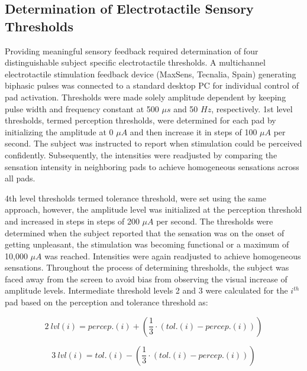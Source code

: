 
\subsection{Determination of Electrotactile Sensory Thresholds}


Providing meaningful sensory feedback required determination of four distinguishable subject specific electrotactile thresholds. A multichannel electrotactile stimulation feedback device (MaxSens, Tecnalia, Spain) generating biphasic pulses was connected to a standard desktop PC for individual control of pad activation. Thresholds were made solely amplitude dependent by keeping pulse width and frequency constant at 500 $\mu s$ and 50 $Hz$, respectively.  1st level thresholds, termed perception thresholds, were determined for each pad by initializing the amplitude at 0 $\mu A$ and then increase it in steps of 100 $\mu A$ per second. The subject was instructed to report when stimulation could be perceived confidently. Subsequently, the intensities were readjusted by comparing the sensation intensity in neighboring pads to achieve homogeneous sensations across all pads. 

4th level thresholds termed tolerance threshold, were set using the same approach, however, the amplitude level was initialized at the perception threshold and increased in steps in steps of 200 $\mu A$ per second. The thresholds were determined when the subject reported that the sensation was on the onset of getting unpleasant, the stimulation was becoming functional or a maximum of 10,000 $\mu A$ was reached. Intensities were again readjusted to achieve homogeneous sensations. Throughout the process of determining thresholds, the subject was faced away from the screen to avoid bias from observing the visual increase of amplitude levels. Intermediate threshold levels 2 and 3 were calculated for the $i^{th}$ pad based on the perception and tolerance threshold as: 

	\begin{equation}
	2~lvl(i) = percep.(i) + (\frac{1}{3} \cdot (tol.(i) - percep.(i)))
	\end{equation}

	\begin{equation}
	3~lvl(i) = tol.(i) - (\frac{1}{3} \cdot (tol.(i) - percep.(i)))
	\end{equation}
